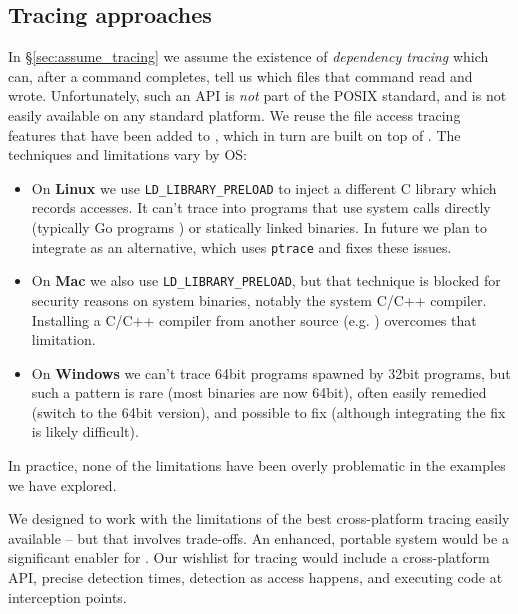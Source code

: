 \subsection{Tracing approaches}
\label{sec:tracing}

In \S\ref{sec:assume_tracing} we assume the existence of \emph{dependency tracing} which can, after a command completes, tell us which files that command read and wrote. Unfortunately, such an API is \emph{not} part of the POSIX standard, and is not easily available on any standard platform. We reuse the file access tracing features that have been added to \Shake \cite{neil:file_access}, which in turn are built on top of \Fsatrace \cite{fsatrace}. The techniques and limitations vary by OS:

\begin{itemize}
\item On \textbf{Linux} we use \texttt{LD\_LIBRARY\_PRELOAD} to inject a different C library which records accesses. It can't trace into programs that use system calls directly (typically Go programs \cite{go}) or statically linked binaries. In future we plan to integrate \Bigbro \cite{bigbro} as an alternative, which uses \texttt{ptrace} and fixes these issues.
\item On \textbf{Mac} we also use \texttt{LD\_LIBRARY\_PRELOAD}, but that technique is blocked for security reasons on system binaries, notably the system C/C++ compiler. Installing a C/C++ compiler from another source (e.g. \Nix \cite{nix}) overcomes that limitation.
\item On \textbf{Windows} we can't trace 64bit programs spawned by 32bit programs, but such a pattern is rare (most binaries are now 64bit), often easily remedied (switch to the 64bit version), and possible to fix (although integrating the fix is likely difficult).
\end{itemize}

\noindent In practice, none of the limitations have been overly problematic in the examples we have explored.


We designed \Rattle to work with the limitations of the best cross-platform tracing easily available -- but that involves trade-offs. An enhanced, portable system would be a significant enabler for \Rattle.
Our wishlist for tracing would include a cross-platform API, precise detection times, detection as access happens, and executing code at interception points.

